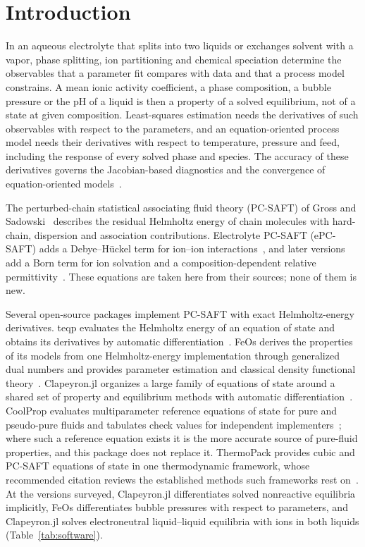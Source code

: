 \section{Introduction}
\label{sec:introduction}
In an aqueous electrolyte that splits into two liquids or exchanges solvent with a vapor, phase splitting, ion partitioning and chemical speciation determine the observables that a parameter fit compares with data and that a process model constrains.
A mean ionic activity coefficient, a phase composition, a bubble pressure or the pH of a liquid is then a property of a solved equilibrium, not of a state at given composition.
Least-squares estimation needs the derivatives of such observables with respect to the parameters, and an equation-oriented process model needs their derivatives with respect to temperature, pressure and feed, including the response of every solved phase and species.
The accuracy of these derivatives governs the Jacobian-based diagnostics and the convergence of equation-oriented models~\citep{Allan2024}.

The perturbed-chain statistical associating fluid theory (PC-SAFT) of Gross and Sadowski~\citep{Gross2001,Gross2002} describes the residual Helmholtz energy of chain molecules with hard-chain, dispersion and association contributions.
Electrolyte PC-SAFT (ePC-SAFT) adds a Debye--H\"uckel term for ion--ion interactions~\citep{Cameretti2005,Held2008,Held2014}, and later versions add a Born term for ion solvation and a composition-dependent relative permittivity~\citep{Bulow2019,Bulow2020,Bulow2021,Figiel2025}.
These equations are taken here from their sources; none of them is new.

Several open-source packages implement PC-SAFT with exact Helmholtz-energy derivatives.
teqp evaluates the Helmholtz energy of an equation of state and obtains its derivatives by automatic differentiation~\citep{bellImplementingEquationState2022}.
FeOs derives the properties of its models from one Helmholtz-energy implementation through generalized dual numbers and provides parameter estimation and classical density functional theory~\citep{rehnerFeOsOpenSourceFramework2023}.
Clapeyron.jl organizes a large family of equations of state around a shared set of property and equilibrium methods with automatic differentiation~\citep{walkerClapeyronjlExtensibleOpenSource2022}.
CoolProp evaluates multiparameter reference equations of state for pure and pseudo-pure fluids and tabulates check values for independent implementers~\citep{bellPurePseudopureFluid2014}; where such a reference equation exists it is the more accurate source of pure-fluid properties, and this package does not replace it.
ThermoPack provides cubic and PC-SAFT equations of state in one thermodynamic framework, whose recommended citation reviews the established methods such frameworks rest on~\citep{wilhelmsenThermodynamicModelingEquations2017}.
At the versions surveyed, Clapeyron.jl differentiates solved nonreactive equilibria implicitly, FeOs differentiates bubble pressures with respect to parameters, and Clapeyron.jl solves electroneutral liquid--liquid equilibria with ions in both liquids (Table~\ref{tab:software}).

